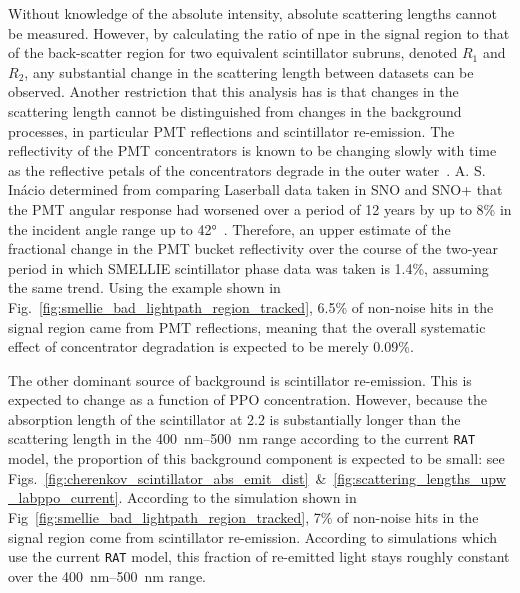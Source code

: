 Without knowledge of the absolute intensity, absolute scattering lengths cannot be measured. However, by calculating the ratio of npe in the signal region to that of the back-scatter region for two equivalent scintillator subruns, denoted $R_{1}$ and $R_{2}$, any substantial change in the scattering length between datasets can be observed. Another restriction that this analysis has is that changes in the scattering length cannot be distinguished from changes in the background processes, in particular PMT reflections and scintillator re-emission. The reflectivity of the PMT concentrators is known to be changing slowly with time as the reflective petals of the concentrators degrade in the outer water~\cite{andersonOpticalCalibrationSNO2021}. %
A. S. In\'{a}cio determined from comparing Laserball data taken in SNO and SNO+ that the PMT angular response had worsened over a period of 12 years by up to 8\% in the incident angle range up to \ang{42}~\cite{inacioDataAnalysisWater2022}. Therefore, an upper estimate of the fractional change in the PMT bucket reflectivity over the course of the two-year period in which SMELLIE scintillator phase data was taken is 1.4\%, assuming the same trend. Using the example shown in Fig.~\ref{fig:smellie_bad_lightpath_region_tracked}, 6.5\% of non-noise hits in the signal region came from PMT reflections, meaning that the overall systematic effect of concentrator degradation is expected to be merely 0.09\%.
 
The other dominant source of background is scintillator re-emission. This is expected to change as a function of PPO concentration. However, because the absorption length of the scintillator at \SI{2.2}{\gpl} is substantially longer than the scattering length in the \SIrange{400}{500}{\nm} range according to the current \texttt{RAT} model, the proportion of this background component is expected to be small: see Figs.~\ref{fig:cherenkov_scintillator_abs_emit_dist}~\&~\ref{fig:scattering_lengths_upw_labppo_current}. According to the simulation shown in Fig~\ref{fig:smellie_bad_lightpath_region_tracked}, 7\% of non-noise hits in the signal region come from scintillator re-emission. According to simulations which use the current \texttt{RAT} model, this fraction of re-emitted light stays roughly constant over the \SIrange{400}{500}{\nm} range.

